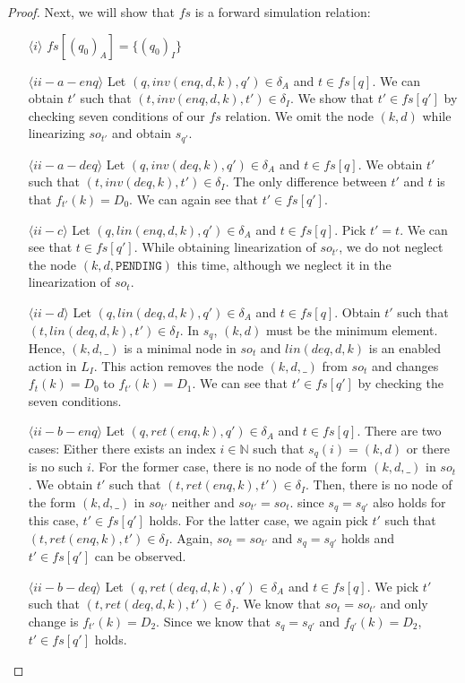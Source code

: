 \begin{proof}
Next, we will show that $fs$ is a forward simulation relation:
\begin{itemize}
\item[$\langle i \rangle$] $fs[(q_0)_A] = \{(q_0)_I\}$
\item[$\langle ii-a-enq \rangle$] Let $(q,inv(enq,d,k),q') \in \delta_A$ and $t \in fs[q]$. We can obtain $t'$ such that $(t,inv(enq,d,k),t') \in \delta_I$. We show that $t' \in fs[q']$ by checking seven conditions of our $fs$ relation. We omit the node $(k,d)$ while linearizing $so_{t'}$ and obtain $s_{q'}$.
\item[$\langle ii-a-deq \rangle$] Let $(q, inv(deq,k), q') \in \delta_A$ and $t \in fs[q]$. We obtain $t'$ such that $(t, inv(deq,k),t') \in \delta_I$. The only difference between $t'$ and $t$ is that $f_{t'}(k) = D_0$. We can again see that $t' \in fs[q']$. 
\item[$\langle ii-c \rangle$] Let $(q,lin(enq,d,k),q') \in \delta_A$ and $t \in fs[q]$. Pick $t' = t$. We can see that $t \in fs[q']$. While obtaining linearization of $so_{t'}$, we do not neglect the node $(k,d, \texttt{PENDING})$ this time, although we neglect it in the linearization of $so_t$.
\item[$\langle ii-d \rangle$] Let $(q, lin(deq,d,k), q') \in \delta_A$ and $t \in fs[q]$. Obtain $t'$ such that $(t, lin(deq,d,k), t') \in \delta_I$. In $s_q$, $(k,d)$ must be the minimum element. Hence, $(k,d,\_)$ is a minimal node in $so_t$ and $lin(deq,d,k)$ is an enabled action in $L_I$. This action removes the node $(k,d,\_)$ from $so_t$ and changes $f_t(k)=D_0$ to $f_{t'}(k)= D_1$. We can see that $t' \in fs[q']$ by checking the seven conditions.
\item[$\langle ii-b-enq \rangle$] Let $(q, ret(enq,k), q') \in \delta_A$ and $t \in fs[q]$. There are two cases: Either there exists an index $i \in \mathbb{N}$ such that $s_q(i) = (k,d)$ or there is no such $i$. For the former case, there is no node of the form $(k,d,\_)$ in $so_t$. We obtain $t'$ such that $(t,ret(enq,k),t') \in \delta_I$. Then, there is no node of the form $(k,d,\_)$ in $so_{t'}$ neither and $so_{t'} = so_t$. since $s_q = s_{q'}$ also holds for this case, $t' \in fs[q']$ holds. For the latter case, we again pick $t'$ such that $(t, ret(enq,k), t') \in \delta_I$. Again, $so_t = so_{t'}$ and $s_q = s_{q'}$ holds and $t' \in fs[q']$ can be observed.
\item[$\langle ii-b-deq \rangle$] Let $(q, ret(deq,d,k), q') \in \delta_A$ and $t \in fs[q]$. We pick $t'$ such that $(t, ret(deq,d,k), t') \in \delta_I$. We know that $so_t = so_{t'}$ and only change is $f_{t'}(k) = D_2$. Since we know that $s_q = s_{q'}$ and $f_{q'}(k) = D_2$, $t' \in fs[q']$ holds.  
\end{itemize}
\end{proof}